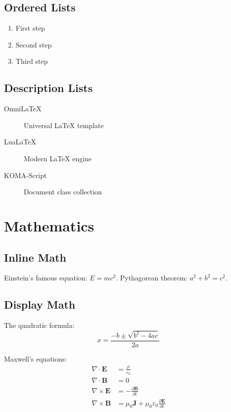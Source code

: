 \documentclass[
    language=english,
    doctype=book,              %
    institution=none,        %
    oneside,                 %
    loadGlossaries=true,          %
]{../../omnilatex}
\begin{document}
\section{Ordered Lists}

\begin{enumerate}
	\item First step
	\item Second step
	\item Third step
\end{enumerate}

\section{Description Lists}

\begin{description}
	\item[OmniLaTeX] Universal LaTeX template
	\item[LuaLaTeX] Modern LaTeX engine
	\item[KOMA-Script] Document class collection
\end{description}

\chapter{Mathematics}

\section{Inline Math}

Einstein's famous equation: $E = mc^2$.
Pythagorean theorem: $a^2 + b^2 = c^2$.

\section{Display Math}

The quadratic formula:
\begin{equation}
	x = \frac{-b \pm \sqrt{b^2 - 4ac}}{2a}
	\label{eq:quadratic}
\end{equation}

Maxwell's equations:
\begin{align}
	\nabla \cdot \mathbf{E}  & = \frac{\rho}{\varepsilon_0}                                                   \\
	\nabla \cdot \mathbf{B}  & = 0                                                                            \\
	\nabla \times \mathbf{E} & = -\frac{\partial \mathbf{B}}{\partial t}                                      \\
	\nabla \times \mathbf{B} & = \mu_0 \mathbf{J} + \mu_0\varepsilon_0 \frac{\partial \mathbf{E}}{\partial t}
\end{align}
\end{document}
